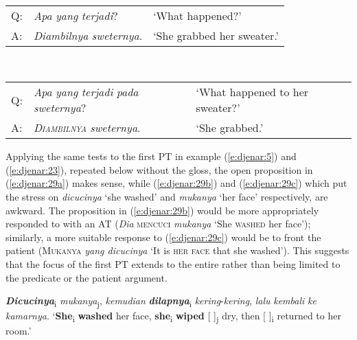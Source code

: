 \documentclass[output=paper
,modfonts
,nonflat]{langsci/langscibook}
\begin{document}
\begin{exe}
	\ex\label{e:djenar:27}
	\begin{xlist}
		\label{e:djenar:27a}\\
		\begin{tabular}{lll}
		Q: & \textit{Apa} \textit{yang} \textit{terjadi}? & ‘What happened?’\\
		A: & \textit{Diambilnya} \textit{sweternya}. & ‘She grabbed her sweater.’\\
		\end{tabular}
		\label{e:djenar:27b}\\
		\begin{tabular}{lll}
		Q: & \textit{Apa} \textit{yang} \textit{terjadi} \textit{pada} \textit{sweternya}? & ‘What happened to her sweater?’\\
		A: & \textsc{\textit{Diambilnya}} \textit{sweternya}. & ‘She grabbed.’\\
		\end{tabular}
	\end{xlist}
\end{exe}

\noindent
Applying the same tests to the first PT  in example (\ref{e:djenar:5}) and (\ref{e:djenar:23}), repeated below without the gloss, the open proposition in (\ref{e:djenar:29a}) makes sense, while (\ref{e:djenar:29b}) and (\ref{e:djenar:29c}) which put the stress on \textit{dicucinya} ‘she washed’ and \textit{mukanya} ‘her face’ respectively, are awkward. The proposition in (\ref{e:djenar:29b}) would be more appropriately responded to with an AT  (\textit{Dia} \textsc{mencuci} \textit{mukanya} ‘She \textsc{washed} her face’); similarly, a more suitable response to (\ref{e:djenar:29c}) would be to front the patient (\textsc{Mukanya} \textit{yang dicucinya} ‘It is \textsc{her face} that she washed’). This suggests that the focus of the first PT  extends to the entire  rather than being limited to the predicate or the patient argument.
   
\begin{exe}
	\ex\label{e:djenar:28}
	\textbf{\textit{Dicucinya}}\textsubscript{i} \textit{mukanya}\textsubscript{j}, \textit{kemudian} \textbf{\textit{dilapnya}}\textsubscript{i} \textit{kering}-\textit{kering}, \textit{lalu} \textit{kembali} \textit{ke} \textit{kamar\-nya}.
	\glt ‘\textbf{She}\textsubscript{i} \textbf{washed} her face, \textbf{she}\textsubscript{i} \textbf{wiped} {[ ]}\textsubscript{j} dry, then {[ ]}\textsubscript{i} returned to her room.’ \hfill \citep[119]{Krisna1977}
\end{exe}
\end{document}
